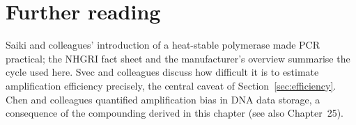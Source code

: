 \section*{Further reading}
Saiki and colleagues' introduction of a heat-stable polymerase made PCR
practical;\cite{Saiki1988} the NHGRI fact sheet and the manufacturer's overview
summarise the cycle used here.\cite{NHGRIPCR,NEBPCR} Svec and colleagues discuss
how difficult it is to estimate amplification efficiency precisely, the central
caveat of Section~\ref{sec:efficiency}.\cite{Svec2015} Chen and colleagues
quantified amplification bias in DNA data storage,\cite{Chen2020bias} a
consequence of the compounding derived in this chapter (see also Chapter~25).
